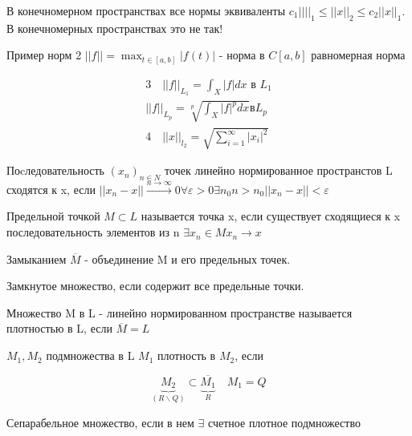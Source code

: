 \documentclass[12pt, a4paper]{report}
\begin{document}
В конечномерном пространствах все нормы эквиваленты \( c_1||||_1 \le  ||x||_2 \le  c_2 ||x||_1 \). В конечномерных пространствах это не так! 

Пример норм 2 \( ||f||  = \max_{t \in [ a,b] }|f(t)|  \) - норма в \( C [ a,b] \) равномерная норма

\begin{gather*}
    3 \quad  ||f||_{L_1} = \int_{X} |f|dx \text{ в  }  L_1 \\
    ||f||_{L_p} = \sqrt[p]{\int_{X}|f|^p dx} \text{в}  L_{p} \\
    4  \quad ||x||_{l_2}= \sqrt{\sum^{\infty }_{i=1} |x_i| ^2   }   
\end{gather*}

\begin{definition}
     Поcледовательность \( (x_n)_{n \in  N}  \) точек линейно нормированное пространстов L сходятся к x, если  \( ||x_n - x|| \xrightarrow{n \to  \infty } 0 \forall \varepsilon > 0 \exists n_0 n > n_0 ||x_n - x|| < \varepsilon   \) 
\end{definition}

\begin{definition}
    Предельной точкой \( M \subset L  \)  называется точка x, если существует сходящиеся к x последовательность элементов из n \( \exists x_n \in  M x_n \to x  \) 
\end{definition}

\begin{definition}
    Замыканием \( \overline{M}  \) - объединение  M и его предельных точек. 
\end{definition}

\begin{definition}
    Замкнутое множество, если содержит все предельные точки.
\end{definition}

\begin{definition}
    Множество M в L - линейно нормированном пространстве называется плотностью в L, если \( \overline{M}= L  \) 
\end{definition}

\begin{definition}
    \( M_1,M_2  \) подмножества в L \( M_1  \)  плотность в \(  M_2 \), если 
    
    \[ \underbrace{M_2}_{(R \backslash Q )} \subset \underbrace{\overline{M_1} }_{R } \quad M_1=Q   \]
\end{definition}

\begin{definition}
    Сепарабельное множество, если в нем \( \exists  \) счетное плотное подмножество
\end{definition}



\ifdefined\mainfile
\else
    
\end{document}
